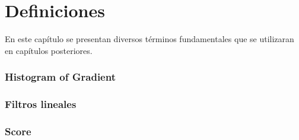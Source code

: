 \chapter[Definiciones ]{Definiciones }\label{ch:capitulo3}
En este capítulo se presentan diversos términos fundamentales que se utilizaran en capítulos posteriores.

\subsection{Histogram of Gradient}
\label{subsec:hog}


\subsection{Filtros lineales}
\label{subsec:fl}

\subsection{Score}
\label{subsec:score}